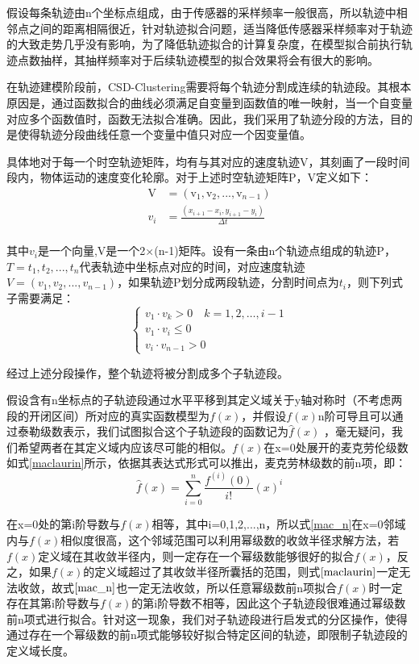 假设每条轨迹由n个坐标点组成，由于传感器的采样频率一般很高，所以轨迹中相邻点之间的距离相隔很近，针对轨迹拟合问题，适当降低传感器采样频率对于轨迹的大致走势几乎没有影响，为了降低轨迹拟合的计算复杂度，在模型拟合前执行轨迹点数抽样，其抽样频率对于后续轨迹模型的拟合效果将会有很大的影响。

在轨迹建模阶段前，CSD-Clustering需要将每个轨迹分割成连续的轨迹段。其根本原因是，通过函数拟合的曲线必须满足自变量到函数值的唯一映射，当一个自变量对应多个函数值时，函数无法拟合准确。因此，我们采用了轨迹分段的方法，目的是使得轨迹分段曲线任意一个变量中值只对应一个因变量值。

具体地对于每一个时空轨迹矩阵，均有与其对应的速度轨迹V，其刻画了一段时间段内，物体运动的速度变化轮廓。对于上述时空轨迹矩阵P，V定义如下：
\[\begin{aligned}
	\text{V}&=\left( \text{v}_1,\text{v}_2,...,\text{v}_{n-1} \right)\\
	v_i&=\frac{\left( x_{i+1}-x_i,y_{i+1}-y_i \right)}{\varDelta t}\\
\end{aligned}\]

其中$v_i$是一个向量,V是一个2×(n-1)矩阵。设有一条由n个轨迹点组成的轨迹P，$T={t_1,t_2,...,t_n}$代表轨迹中坐标点对应的时间，对应速度轨迹$V=(v_1,v_2,...,v_{n-1})$，如果轨迹P划分成两段轨迹，分割时间点为$t_i$，则下列式子需要满足：
\[
\left\{\begin{array}{c}
{v_{1} \cdot v_{k}>0 \quad k=1,2, \ldots, i-1} \\
{v_{1} \cdot v_{i} \leq 0} \\
{v_{i} \cdot v_{n-1}>0}
\end{array}\right.
\]

经过上述分段操作，整个轨迹将被分割成多个子轨迹段。

假设含有n坐标点的子轨迹段通过水平平移到其定义域关于y轴对称时（不考虑两段的开闭区间）所对应的真实函数模型为$f(x)$，并假设$f(x)$n阶可导且可以通过泰勒级数表示，我们试图拟合这个子轨迹段的函数记为$\hat{f}\left( x \right)$ ，毫无疑问，我们希望两者在其定义域内应该尽可能的相似。$f(x)$在x=0处展开的麦克劳伦级数如式\ref{maclaurin}所示，依据其表达式形式可以推出，麦克劳林级数的前n项，即：
\begin{equation}
\label{mac_n}
\hat{f}\left( x \right) =\sum_{i=0}^n{\frac{f^{\left( i \right)}\left( 0 \right)}{i!}}\left( x \right) ^i
\end{equation}

在x=0处的第i阶导数与$f(x)$相等，其中i=0,1,2,...,n，所以式\ref{mac_n}在x=0邻域内与$f(x)$相似度很高，这个邻域范围可以利用幂级数的收敛半径求解方法，若$f(x)$定义域在其收敛半径内，则一定存在一个幂级数能够很好的拟合$f(x)$，反之，如果$f(x)$的定义域超过了其收敛半径所囊括的范围，则式$\ref{maclaurin}$一定无法收敛，故式$\ref{mac_n}$也一定无法收敛，所以任意幂级数前n项拟合$f(x)$时一定存在其第i阶导数与$f(x)$的第i阶导数不相等，因此这个子轨迹段很难通过幂级数前n项式进行拟合。针对这一现象，我们对子轨迹段进行启发式的分区操作，使得通过存在一个幂级数的前n项式能够较好拟合特定区间的轨迹，即限制子轨迹段的定义域长度。

